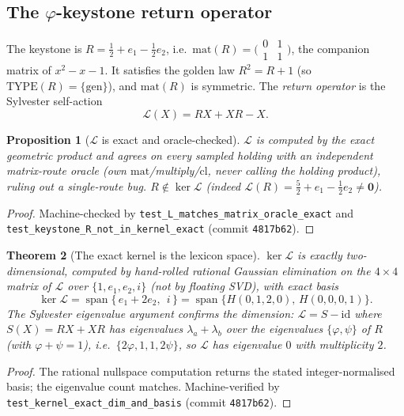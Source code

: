 \documentclass[11pt]{article}
\theoremstyle{plain}
\newtheorem{theorem}{Theorem}[section]
\newtheorem{proposition}[theorem]{Proposition}
\theoremstyle{definition}
\theoremstyle{remark}
\newcommand{\Lop}{\mathcal{L}}
\newcommand{\VOID}{\mathbf{0}}
\DeclareMathOperator{\spn}{span}
\begin{document}
\subsection{The $\varphi$-keystone return operator}
The keystone is $R=\tfrac12+e_1-\tfrac12 e_2$, i.e.\ $\mathrm{mat}(R)=\big(\begin{smallmatrix}0&1\\1&1\end{smallmatrix}\big)$,
the companion matrix of $x^2-x-1$. It satisfies the golden law $R^2=R+1$ (so $\mathrm{TYPE}(R)=\{\text{gen}\}$),
and $\mathrm{mat}(R)$ is symmetric. The \emph{return operator} is the Sylvester self-action
\begin{equation}\label{eq:Lop}
  \Lop(X)=RX+XR-X .
\end{equation}

\begin{proposition}[$\Lop$ is exact and oracle-checked]\label{prop:Lop}
$\Lop$ is computed by the exact geometric product and agrees on every sampled holding with an
\emph{independent} matrix-route oracle (own $\mathrm{mat}$/multiply/$\mathrm{cl}$, never calling the holding
product), ruling out a single-route bug. $R\notin\ker\Lop$ (indeed $\Lop(R)=\tfrac52+e_1-\tfrac12 e_2\ne\VOID$).
\end{proposition}
\begin{proof}
Machine-checked by \texttt{test\_L\_matches\_matrix\_oracle\_exact} and
\texttt{test\_keystone\_R\_not\_in\_kernel\_exact} (commit \texttt{4817b62}).
\end{proof}

\begin{theorem}[The exact kernel is the lexicon space]\label{thm:kernel}
$\ker\Lop$ is exactly two-dimensional, computed by hand-rolled rational Gaussian elimination on the $4\times4$
matrix of $\Lop$ over $\{1,e_1,e_2,i\}$ (not by floating SVD), with exact basis
\[
  \ker\Lop=\spn\{\,e_1+2e_2,\ \ i\,\}=\spn\{H(0,1,2,0),\,H(0,0,0,1)\}.
\]
The Sylvester eigenvalue argument confirms the dimension: $\Lop=S-\mathrm{id}$ where $S(X)=RX+XR$ has
eigenvalues $\lambda_a+\lambda_b$ over the eigenvalues $\{\varphi,\psi\}$ of $R$ (with $\varphi+\psi=1$), i.e.\
$\{2\varphi,1,1,2\psi\}$, so $\Lop$ has eigenvalue $0$ with multiplicity $2$.
\end{theorem}
\begin{proof}
The rational nullspace computation returns the stated integer-normalised basis; the eigenvalue count matches.
Machine-verified by \texttt{test\_kernel\_exact\_dim\_and\_basis} (commit \texttt{4817b62}).
\end{proof}
\end{document}
